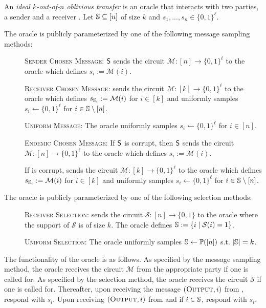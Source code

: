 \begin{definition}\label{def:ot}
An \emph{ideal $k$-out-of-$n$ oblivious transfer} is an oracle that interacts with two parties, a sender \send and a receiver \rec. Let $\mathsf{\mathbb S}\subseteq[n]$ of size $k$ and  $s_1,...,s_n\in \{0,1\}^\ell$.

The oracle is publicly parameterized by one of the following message sampling methods:
\begin{description}
\item[] \textsc{Sender Chosen Message:} $\mathsf{S}$ sends the circuit $\mathcal{M} : [n] \rightarrow \{0,1\}^\ell$ to the oracle which defines $s_i:=\mathcal{M}(i)$.

\item[] \textsc{Receiver Chosen Message:} \rec sends the circuit  $\mathcal{M} : [k] \rightarrow \{0,1\}^\ell$ to the oracle which defines $s_{\mathsf{\mathbb S}_i}:=\mathcal{M}(i)$ for $i\in[k]$ and uniformly samples $s_i\gets\{0,1\}^\ell$ for $i\in\mathsf{\mathbb S}\setminus[n]$.

\item[] \textsc{Uniform Message:} The oracle uniformly samples $s_i\gets\{0,1\}^{\ell}$ for $i\in[n]$. 
 
\item[] \textsc{Endemic Chosen Message:} If $\mathsf{S}$ is corrupt, then $\mathsf{S}$ sends the circuit $\mathcal{M} : [n] \rightarrow \{0,1\}^\ell$ to the oracle which defines $s_i:=\mathcal{M}(i)$.

If \rec is corrupt, \rec sends the circuit  $\mathcal{M} : [k] \rightarrow \{0,1\}^\ell$ to the oracle which defines $s_{\mathsf{\mathbb S}_i}:=\mathcal{M}(i)$ for $i\in[k]$ and uniformly samples $s_i\gets\{0,1\}^\ell$ for $i\in\mathsf{\mathbb S}\setminus[n]$.
\end{description}

The oracle is publicly parameterized by one of the following selection methods:
\begin{description}
	\item[] \textsc{Receiver Selection:} \rec sends the circuit $\mathcal{S}:[n]\rightarrow\{0,1\}$ to the oracle where the support of $\mathcal{S}$ is of size $k$. The oracle defines $\mathsf{\mathbb S}:=\{i \mid \mathcal{S}(i)=1\}$.
	\item[] \textsc{Uniform Selection:} The oracle uniformly samples $\mathsf{\mathbb S}\gets\mathbb{P}([n])$ s.t. $|\mathsf{\mathbb S}|=k$.
\end{description}

The functionality of the oracle is as follows. As specified by the message sampling method, the oracle receives the circuit $\mathcal{M}$ from the appropriate party if one is called for.  As specified by the selection method, the oracle receives the circuit $\mathcal{S}$ if one is called for. 
Thereafter, upon receiving the message $(\textsc{Output}, i)$ from \send, respond with $s_i$. Upon receiving $(\textsc{Output}, i)$ from \rec and if $i\in \mathsf{\mathbb S}$,  respond with $s_i$. 


\end{definition}
